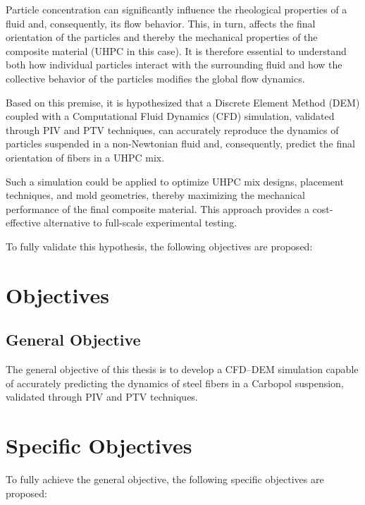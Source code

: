 Particle concentration can significantly influence the rheological properties of a fluid and, consequently, its flow behavior. This, in turn, affects the final orientation of the particles and thereby the mechanical properties of the composite material (UHPC in this case). It is therefore essential to understand both how individual particles interact with the surrounding fluid and how the collective behavior of the particles modifies the global flow dynamics.

Based on this premise, it is hypothesized that a Discrete Element Method (DEM) coupled with a Computational Fluid Dynamics (CFD) simulation, validated through PIV and PTV techniques, can accurately reproduce the dynamics of particles suspended in a non-Newtonian fluid and, consequently, predict the final orientation of fibers in a UHPC mix.

Such a simulation could be applied to optimize UHPC mix designs, placement techniques, and mold geometries, thereby maximizing the mechanical performance of the final composite material. This approach provides a cost-effective alternative to full-scale experimental testing.

To fully validate this hypothesis, the following objectives are proposed:

\section{Objectives}

\subsection{General Objective}

The general objective of this thesis is to develop a CFD–DEM simulation capable of accurately predicting the dynamics of steel fibers in a Carbopol suspension, validated through PIV and PTV techniques.

\section{Specific Objectives}

To fully achieve the general objective, the following specific objectives are proposed:

